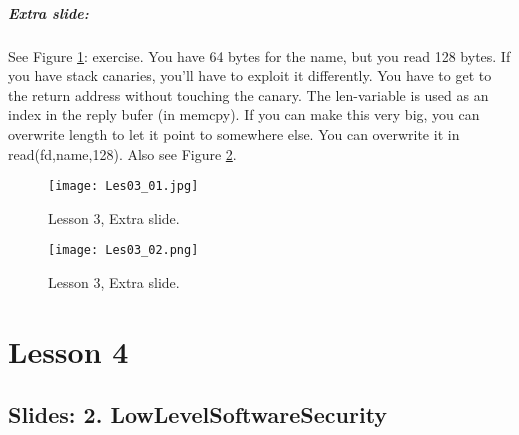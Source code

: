 \documentclass[10pt,a4paper]{report}
\begin{document}
\paragraph{Extra slide:} See Figure \ref{les03_01}: exercise. You have 64 bytes for the name, but you read 128 bytes. If you have stack canaries, you'll have to exploit it differently. You have to get to the return address without touching the canary. The len-variable is used as an index in the reply bufer (in memcpy). If you can make this very big, you can overwrite length to let it point to somewhere else. You can overwrite it in read(fd,name,128). Also see Figure \ref{les03_02}. 

\begin{figure}[ht!]
\centering
\texttt{[image: Les03\_01.jpg]}
\caption{Lesson 3, Extra slide.} 
\label{les03_01}
\end{figure}

\begin{figure}[ht!]
\centering
\texttt{[image: Les03\_02.png]}
\caption{Lesson 3, Extra slide.} 
\label{les03_02}
\end{figure}

\chapter{Lesson 4}
\section{Slides: 2. LowLevelSoftwareSecurity}
\end{document}
